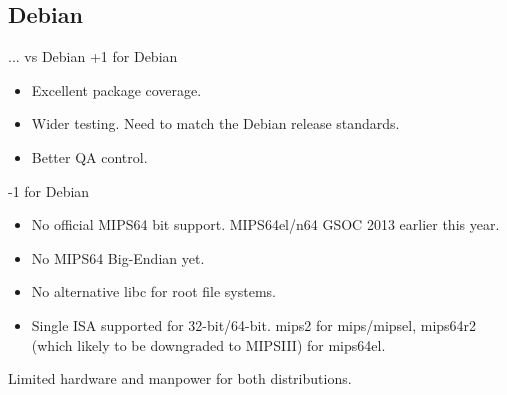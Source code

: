 \documentclass{beamer}
\begin{document}
\subsection{Debian}
\begin{frame}{... vs Debian}
+1 for Debian
	\begin{itemize}
		\item Excellent package coverage.
		\item Wider testing. Need to match the Debian release standards.
		\item Better QA control.
	\end{itemize}
-1 for Debian
	\begin{itemize}
		\item No official MIPS64 bit support. MIPS64el/n64 GSOC 2013 earlier this year.
		\item No MIPS64 Big-Endian yet.
		\item No alternative libc for root file systems.
		\item Single ISA supported for 32-bit/64-bit. mips2 for mips/mipsel, mips64r2 (which likely to be downgraded to MIPSIII) for mips64el.
	\end{itemize}
Limited hardware and manpower for both distributions.
\end{frame}
\end{document}
